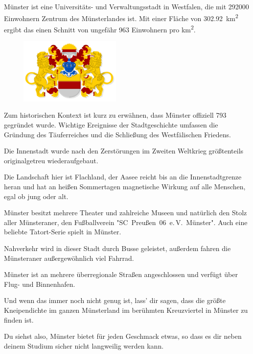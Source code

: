 \enlargethispage{5.5pt}
\begin{multicols}{2}
Münster ist eine Universitäts- und Verwaltungsstadt in Westfalen, die mit \num{292000} Einwohnern Zentrum des Münsterlandes ist. Mit einer Fläche von \SI{302,92}{\km\squared} ergibt das einen Schnitt von ungefähr \num{963} Einwohnern pro \si{\km\squared}.

\setlength{\intextsep}{0cm}
\setlength{\columnsep}{0.2cm}
\begin{figure}
\centering
\includegraphics[width=5cm]{res/muenster_stadt_wappen.pdf}
\end{figure}
Zum historischen Kontext ist kurz zu erwähnen, dass Münster offiziell 793 gegründet wurde. Wichtige Ereignisse der Stadtgeschichte umfassen die Gründung des Täuferreiches und die Schließung des Westfälischen Friedens.

Die Innenstadt wurde nach den Zerstörungen im Zweiten Weltkrieg größtenteils originalgetreu wiederaufgebaut.

Die Landschaft hier ist Flachland, der Aasee reicht bis an die Innenstadtgrenze heran und hat an heißen Sommertagen magnetische Wirkung auf alle Menschen, egal ob jung oder alt.

Münster besitzt mehrere Theater und zahlreiche  Museen und natürlich den Stolz aller Münsteraner, den Fußballverein "SC~Preußen~06~e.\,V.~Münster". Auch eine beliebte Tatort-Serie spielt in Münster.

Nahverkehr wird in dieser Stadt durch Busse geleistet, außerdem fahren die Münsteraner außergewöhnlich viel Fahrrad.

Münster ist an mehrere überregionale Straßen angeschlossen und verfügt über Flug- und Binnenhafen.

\setlength{\columnsep}{0.2cm}
\begin{figure}
	\centering
\end{figure}
Und wenn das immer noch nicht genug ist, lass' dir sagen, dass die größte Kneipendichte im ganzen Münsterland im berühmten Kreuzviertel in Münster zu finden ist.

Du siehst also, Münster bietet für jeden Geschmack etwas, so dass es dir neben deinem Studium sicher nicht langweilig werden kann.

\begin{center}
\large{}
\end{center}

\end{multicols}
